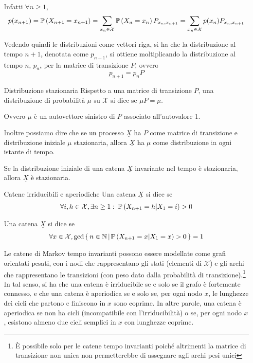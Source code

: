 Infatti \(\forall n\geq 1\), 
\[p(x_{n+1}) = \Prob[X_{n+1}=x_{n+1}] = \sum_{x_n\in\mathcal{X}}\Prob[X_n = x_n]P_{x_n,x_{n+1}} = \sum_{x_n\in\mathcal{X}}p(x_n)P_{x_n,x_{n+1}}\]

Vedendo quindi le distribuzioni come vettori riga, si ha che la distribuzione al tempo \(n+1\), denotata come \(p_{n+1}\), si ottiene moltiplicando la distribuzione al tempo \(n\), \(p_n\), per la matrice di transizione \(P\), ovvero
\[p_{n+1} = p_n P\]

\begin{definition}{Distribuzione stazionaria}
Rispetto a una matrice di transizione \(P\), una distribuzione di probabilità \(\mu\) su \(\mathcal{X}\) si dice  se \(\mu P = \mu\).

Ovvero \(\mu\) è un autovettore sinistro di \(P\) associato all'autovalore \(1\).

Inoltre possiamo dire che se un processo \(\underline{X}\) ha \(P\) come matrice di transizione e distribuzione iniziale \(\mu\) stazionaria, allora \(\underline{X}\) ha \(\mu\) come distribuzione in ogni istante di tempo.
\end{definition}

\begin{proposition}{}
  Se la distribuzione iniziale di una catena \(\underline{X}\) invariante nel tempo è stazionaria, allora \(\underline{X}\) è stazionaria.
\end{proposition}

\begin{definition}{Catene irriducibili e aperiodiche}
  Una catena \(\underline{X}\) si dice  se
  \[\forall i,h \in \mathcal{X}, \exists n \geq 1 \st \Prob[X_{n+1} = h|X_1 = i] > 0\]

  Una catena \(\underline{X}\) si dice  se
  \[\forall x \in \mathcal{X}, \gcd \set{n\in\N}[\Prob[X_{n+1} = x|X_1=x]>0] = 1\]
\end{definition}

Le catene di Markov tempo invarianti possono essere modellate come grafi orientati pesati, con i nodi che rappresentano gli stati (elementi di \(\mathcal{X}\)) e gli archi che rappresentano le transizioni (con peso dato dalla probabilità di transizione).\footnote{È possibile solo per le catene tempo invarianti poiché altrimenti la matrice di transizione non unica non permetterebbe di assegnare agli archi pesi unici}
In tal senso, si ha che una catena è irriducibile se e solo se il grafo è fortemente connesso, e che una catena è aperiodica se e solo se, per ogni nodo \(x\), le lunghezze dei cicli che partono e finiscono in \(x\) sono coprime.
In altre parole, una catena è aperiodica se non ha cicli (incompatibile con l'irriducibilità) o se, per ogni nodo \(x\), esistono almeno due cicli semplici in \(x\) con lunghezze coprime.

